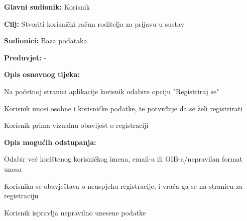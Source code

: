 					\noindent {}
					\begin{packed_item}
						
						\item \textbf{Glavni sudionik: }Korisnik
						\item  \textbf{Cilj:} Stvoriti korisnički račun roditelja za prijavu u sustav
						\item  \textbf{Sudionici:} Baza podataka
						\item  \textbf{Preduvjet:} -
						\item  \textbf{Opis osnovnog tijeka:}
						
						\item[] \begin{packed_enum}
							
							\item Na početnoj stranici aplikacije korisnik odabire opciju "Registriraj se"
							\item Korisnik unosi osobne i korisničke podatke, te potvrđuje da se želi registrirati
							\item Korisnik prima vizualnu obavijest o registraciji
						\end{packed_enum}
						
						\item  \textbf{Opis mogućih odstupanja:}
						
						\item[] \begin{packed_item}
							
							\item[2.a] Odabir već korištenog korisničkog imena, email-a ili OIB-a/nepravilan format unosa
							\item[] \begin{packed_enum}
								
								\item Korisnika se obavještava o neuspjehu registracije, i vraća ga se na stranicu za registraciju
								\item Korisnik ispravlja nepravilno unesene podatke
								
							\end{packed_enum}
						\end{packed_item}
					\end{packed_item}
					
